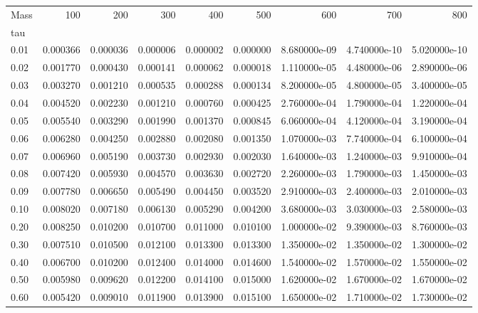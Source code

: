 \begin{tabular}{lrrrrrrrr}
\toprule
Mass &       100 &       200 &       300 &       400 &       500 &           600 &           700 &           800 \\
tau   &           &           &           &           &           &               &               &               \\
\midrule
0.01  &  0.000366 &  0.000036 &  0.000006 &  0.000002 &  0.000000 &  8.680000e-09 &  4.740000e-10 &  5.020000e-10 \\
0.02  &  0.001770 &  0.000430 &  0.000141 &  0.000062 &  0.000018 &  1.110000e-05 &  4.480000e-06 &  2.890000e-06 \\
0.03  &  0.003270 &  0.001210 &  0.000535 &  0.000288 &  0.000134 &  8.200000e-05 &  4.800000e-05 &  3.400000e-05 \\
0.04  &  0.004520 &  0.002230 &  0.001210 &  0.000760 &  0.000425 &  2.760000e-04 &  1.790000e-04 &  1.220000e-04 \\
0.05  &  0.005540 &  0.003290 &  0.001990 &  0.001370 &  0.000845 &  6.060000e-04 &  4.120000e-04 &  3.190000e-04 \\
0.06  &  0.006280 &  0.004250 &  0.002880 &  0.002080 &  0.001350 &  1.070000e-03 &  7.740000e-04 &  6.100000e-04 \\
0.07  &  0.006960 &  0.005190 &  0.003730 &  0.002930 &  0.002030 &  1.640000e-03 &  1.240000e-03 &  9.910000e-04 \\
0.08  &  0.007420 &  0.005930 &  0.004570 &  0.003630 &  0.002720 &  2.260000e-03 &  1.790000e-03 &  1.450000e-03 \\
0.09  &  0.007780 &  0.006650 &  0.005490 &  0.004450 &  0.003520 &  2.910000e-03 &  2.400000e-03 &  2.010000e-03 \\
0.10  &  0.008020 &  0.007180 &  0.006130 &  0.005290 &  0.004200 &  3.680000e-03 &  3.030000e-03 &  2.580000e-03 \\
0.20  &  0.008250 &  0.010200 &  0.010700 &  0.011000 &  0.010100 &  1.000000e-02 &  9.390000e-03 &  8.760000e-03 \\
0.30  &  0.007510 &  0.010500 &  0.012100 &  0.013300 &  0.013300 &  1.350000e-02 &  1.350000e-02 &  1.300000e-02 \\
0.40  &  0.006700 &  0.010200 &  0.012400 &  0.014000 &  0.014600 &  1.540000e-02 &  1.570000e-02 &  1.550000e-02 \\
0.50  &  0.005980 &  0.009620 &  0.012200 &  0.014100 &  0.015000 &  1.620000e-02 &  1.670000e-02 &  1.670000e-02 \\
0.60  &  0.005420 &  0.009010 &  0.011900 &  0.013900 &  0.015100 &  1.650000e-02 &  1.710000e-02 &  1.730000e-02 \\

\end{tabular}
